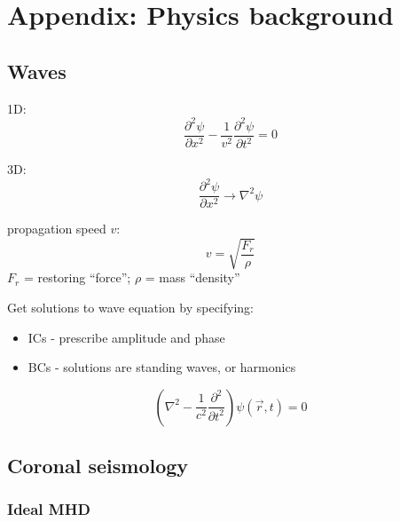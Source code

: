 



%
%
%
%


\section{Appendix: Physics background}


% 
\subsection{Waves}




1D:
\[
    \frac{\partial^{2}\psi}{\partial x^{2}}
    - \frac{1}{v^{2}}\frac{\partial^{2}\psi}{\partial t^{2}}
    = 0
    \]

3D:
\[
    \frac{\partial^{2}\psi}{\partial x^{2}} \rightarrow
    \nabla^{2}\psi
    \]


propagation speed $v$:
\[
    v = \sqrt{ \frac{F_{r}}{\rho}}
    \]
$F_{r}$ = restoring ``force'';
$\rho$ = mass ``density''

Get solutions to wave equation by specifying:
\begin{itemize}
    \item ICs - prescribe amplitude and phase
    \item BCs - solutions are standing waves, or harmonics
\end{itemize}


\[
    \left( \nabla^{2} - \frac{1}{c^{2}} \frac{\partial^{2}}{\partial t^{2}} \right)
    \psi\left( \vec{r},t \right)
    = 0
    \]









\subsection{Coronal seismology}\label{cs}

\subsubsection{Ideal MHD}\label{idealMHD}

